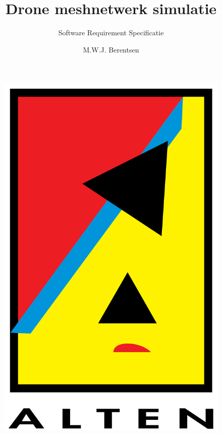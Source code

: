 \documentclass[a4paper, 11pt, oneside]{report}
\author{M.W.J. Berentsen}
\title{\myfont Drone meshnetwerk simulatie}
\subtitle{Software Requirement Specificatie}{Versie 1.0}{Alten Nederland B.V.}{Hogeschool van Arnhem en Nijmegen}{HBO Technische Informatica - Embedded Software Developement }{MWJ.Berentsen@student.han.nl}{Studentnummer: 561399}{Docent: J. Visch, MSc}{Assessor: ir. C.G.R. van Uffelen}
\begin{document}
\begin{figure}
\begin{center}\includegraphics[scale=0.1]{alten}\end{center}
\end{figure}
\maketitle

\end{document}
